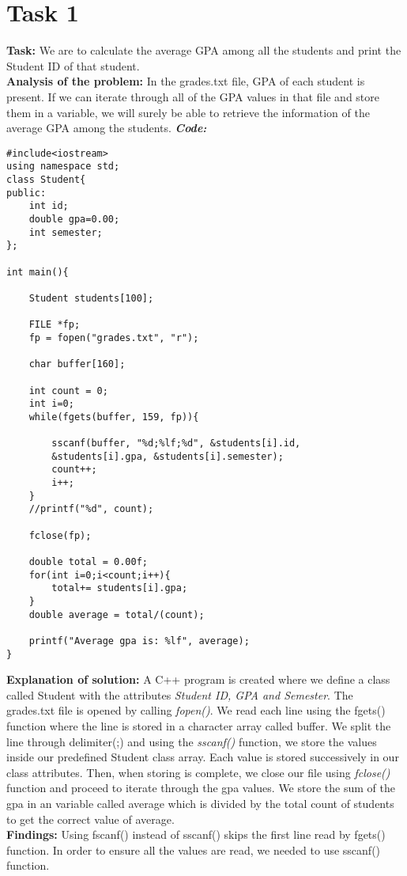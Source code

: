 \documentclass[a4paper, left=1in, right=1in,12pt]{article}
\begin{document}
\section*{Task 1}
\textbf{Task: }We are to calculate the average GPA among all the students and print the Student ID of that student.\\
\textbf{Analysis of the problem: }In the grades.txt file, GPA of each student is present. If we can iterate through all of the GPA values in that file and store them in a variable, we will surely be able to retrieve the information of the average GPA among the students.\newline\newline
\textbf{\textit{\large Code:}}\newline
\begin{verbatim}
#include<iostream>
using namespace std;
class Student{
public:
    int id;
    double gpa=0.00;
    int semester;
};

int main(){

    Student students[100];

    FILE *fp;
    fp = fopen("grades.txt", "r");

    char buffer[160];

    int count = 0;
    int i=0;
    while(fgets(buffer, 159, fp)){

        sscanf(buffer, "%d;%lf;%d", &students[i].id,
        &students[i].gpa, &students[i].semester);
        count++;
        i++;
    }
    //printf("%d", count);

    fclose(fp);

    double total = 0.00f;
    for(int i=0;i<count;i++){
        total+= students[i].gpa;
    }
    double average = total/(count);

    printf("Average gpa is: %lf", average);
}

\end{verbatim}
\textbf{Explanation of solution: }A C++ program is created where we define a class called Student with the attributes \textit{Student ID, GPA and Semester}. The grades.txt file is opened by calling \textit{fopen()}. We read each line using the fgets() function where the line is stored in a character array called buffer. We split the line through delimiter(;)  and using the \textit{sscanf()} function, we store the values inside our predefined Student class array. Each value is stored successively in our class attributes.
Then, when storing is complete, we close our file using \textit{fclose()} function and proceed to iterate through the gpa values. We store the sum of the gpa in an variable called average which is divided by the total count of students to get the correct value of average.\\
\newline
\textbf{Findings: }Using fscanf() instead of sscanf() skips the first line read by fgets() function. In order to ensure all the values are read, we needed to use sscanf() function.
\end{document}
